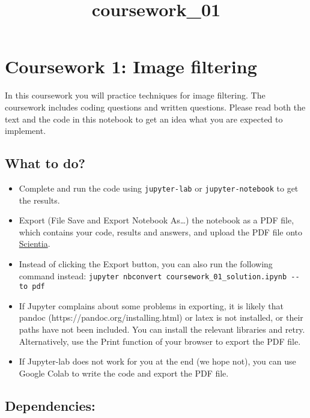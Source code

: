 \documentclass[11pt]{article}
\title{coursework\_01}
\begin{document}
    
    \maketitle
    
    

    
    \hypertarget{coursework-1-image-filtering}{%
\section{Coursework 1: Image
filtering}\label{coursework-1-image-filtering}}

In this coursework you will practice techniques for image filtering. The
coursework includes coding questions and written questions. Please read
both the text and the code in this notebook to get an idea what you are
expected to implement.

\hypertarget{what-to-do}{%
\subsection{What to do?}\label{what-to-do}}

\begin{itemize}
\item
  Complete and run the code using \texttt{jupyter-lab} or
  \texttt{jupyter-notebook} to get the results.
\item
  Export (File \textbar{} Save and Export Notebook As\ldots) the
  notebook as a PDF file, which contains your code, results and answers,
  and upload the PDF file onto
  \href{https://scientia.doc.ic.ac.uk}{Scientia}.
\item
  Instead of clicking the Export button, you can also run the following
  command instead:
  \texttt{jupyter\ nbconvert\ coursework\_01\_solution.ipynb\ -\/-to\ pdf}
\item
  If Jupyter complains about some problems in exporting, it is likely
  that pandoc (https://pandoc.org/installing.html) or latex is not
  installed, or their paths have not been included. You can install the
  relevant libraries and retry. Alternatively, use the Print function of
  your browser to export the PDF file.
\item
  If Jupyter-lab does not work for you at the end (we hope not), you can
  use Google Colab to write the code and export the PDF file.
\end{itemize}

\hypertarget{dependencies}{%
\subsection{Dependencies:}\label{dependencies}}
\end{document}
